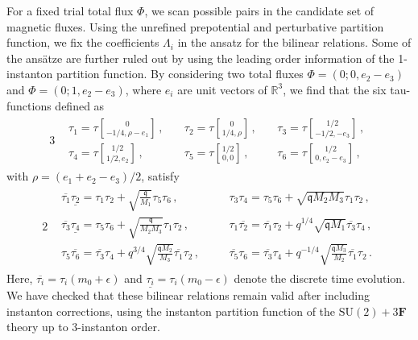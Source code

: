 \documentclass[11pt, a4paper]{article}
\newcommand{\tauftn}[2]{\tau\genfrac[]{0pt}{1}{#1}{#2}}
\theoremstyle{definition}
\begin{document}
For a fixed trial total flux $ \Phi $, we scan possible pairs in the candidate set of magnetic fluxes. Using the unrefined prepotential and perturbative partition function, we fix the coefficients $ \Lambda_i $ in the ansatz for the bilinear relations. Some of the ans\"atze are further ruled out by using the leading order information of the 1-instanton partition function. By considering two total fluxes $ \Phi = (0; 0, e_2-e_3) $ and $ \Phi = (0; 1, e_2-e_3) $, where $ e_i $ are unit vectors of $ \mathbb{R}^3 $, we find that the six tau-functions defined as
\begin{alignat}{3}
    \begin{aligned}
        &\tau_1 = \tauftn{0}{-1/4,\rho-e_1} \, , \
        &&\tau_2 = \tauftn{0}{1/4, \rho} \, , \
        &&\tau_3 = \tauftn{1/2}{-1/2,-e_3} \, , \\
        &\tau_4 = \tauftn{1/2}{1/2,e_2} \, , \
        &&\tau_5 = \tauftn{1/2}{0,0} \, , \
        &&\tau_6 = \tauftn{1/2}{0,e_2-e_3} \, ,
    \end{aligned}
\end{alignat}
with $ \rho = (e_1+e_2-e_3)/2 $, satisfy
\begin{alignat}{2}
    \begin{aligned}\label{eq:3F-bilinear}
        & \overline{\tau_1} \underline{\tau_2} = \tau_1 \tau_2 + \sqrt{\frac{\mathfrak{q}}{M_1}} \tau_5 \tau_6 \, , \quad
        && \tau_3 \tau_4 = \tau_5 \tau_6 + \sqrt{\mathfrak{q}M_2M_3} \tau_1 \tau_2 \, , \\
        & \overline{\tau_3} \underline{\tau_4} = \tau_5 \tau_6 + \sqrt{\frac{\mathfrak{q}}{M_2M_3}} \tau_1 \tau_2 \, , \quad
        && \tau_1 \overline{\tau_2} = \overline{\tau_1} \tau_2 + q^{1/4} \sqrt{\mathfrak{q}M_1} \overline{\tau_3} \tau_4 \, , \\
        & \tau_5 \overline{\tau_6} = \overline{\tau_3} \tau_4 + q^{3/4} \sqrt{\frac{\mathfrak{q}M_2}{M_3}} \overline{\tau_1} \tau_2 \, , \quad
        && \overline{\tau_5} \tau_6 = \overline{\tau_3} \tau_4 + q^{-1/4} \sqrt{\frac{\mathfrak{q}M_3}{M_2}} \overline{\tau_1} \tau_2 \, .
    \end{aligned}
\end{alignat}
Here, $ \overline{\tau_i} = \tau_i(m_0+\epsilon) $ and $ \underline{\tau_i}=\tau_i(m_0-\epsilon) $ denote the discrete time evolution. We have checked that these bilinear relations remain valid after including instanton corrections, using the instanton partition function of the $ \mathrm{SU}(2)+3\mathbf{F} $ theory up to 3-instanton order.
\end{document}
